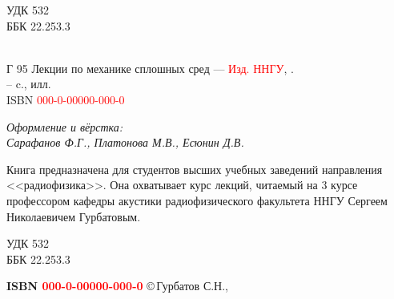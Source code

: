 \begin{titlepage}
\thispagestyle{empty}

\begin{flushleft}
УДК 532 \\
ББК 22.253.3\\

\end{flushleft}

\vskip 20pt

\hphantom{Г 95}{\bf Гурбатов С.Н.}\\
Г 95\hspace{1em} Лекции по механике сплошных сред --- \textcolor{red}{Изд. ННГУ}, \the\year. \\
 -- \pageref{LastPage} c., илл.\\[1.1em]
 ISBN \textcolor{red}{000-0-00000-000-0}
% 

\vskip 30pt
\begin{center}
\it
Оформление и вёрстка: \\Сарафанов Ф.Г., Платонова М.В., Есюнин Д.В.
\end{center}
\vskip 30pt

{\small
Книга предназначена для студентов высших учебных заведений направления <<радиофизика>>. Она охватывает курс лекций, читаемый на 3 курсе профессором кафедры акустики радиофизического факультета ННГУ Сергеем Николаевичем Гурбатовым.
}
\vskip 100pt

\vfill
\begin{flushright}
УДК 532 \\
ББК 22.253.3
\end{flushright}


{\bf  ISBN \textcolor{red}{000-0-00000-000-0}} \hfill \copyright\,Гурбатов С.Н., \the\year
\end{titlepage}